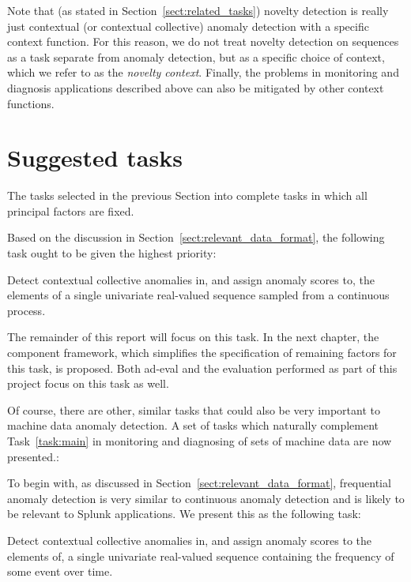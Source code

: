 Note that (as stated in Section~\ref{sect:related_tasks}) novelty detection is really just contextual (or contextual collective) anomaly detection with a specific context function. For this reason, we do not treat novelty detection on sequences as a task separate from anomaly detection, but as a specific choice of context, which we refer to as the \emph{novelty context}. Finally, the problems in monitoring and diagnosis applications described above can also be mitigated by other context functions.

\section{Suggested tasks}
\label{sect:suggested_tasks}

The tasks selected in the previous Section into complete tasks in which all principal factors are fixed.

Based on the discussion in Section~\ref{sect:relevant_data_format}, the following task ought to be given the highest priority:
\begin{task}
\label{task:main}
  Detect contextual collective anomalies in, and assign anomaly scores to, the elements of a single univariate real-valued sequence sampled from a continuous process.
\end{task}

The remainder of this report will focus on this task. In the next chapter, the component framework, which simplifies the specification of remaining factors for this task, is proposed. Both ad-eval and the evaluation performed as part of this project focus on this task as well.

Of course, there are other, similar tasks that could also be very important to machine data anomaly detection. A set of tasks which naturally complement Task~\ref{task:main} in monitoring and diagnosing of sets of machine data are now presented.:

To begin with, as discussed in Section~\ref{sect:relevant_data_format}, frequential anomaly detection is very similar to continuous anomaly detection and is likely to be relevant to Splunk applications. We present this as the following task:

\begin{task}
  Detect contextual collective anomalies in, and assign anomaly scores to the elements of, a single univariate real-valued sequence containing the frequency of some event over time.
\end{task}

